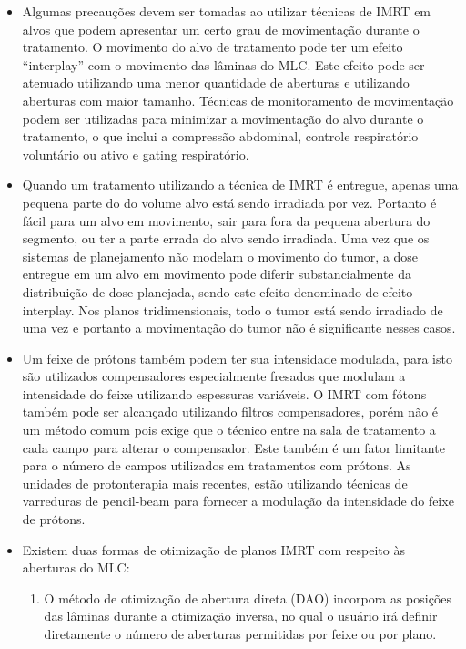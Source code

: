 \documentclass[11pt,a4paper]{article}
\newcounter{exemplo}
\begin{document}
\begin{exemplo}
\begin{itemize}
        \item Algumas precauções devem ser tomadas ao utilizar técnicas de IMRT em alvos que podem apresentar um certo grau de movimentação durante o tratamento. O movimento do alvo de tratamento pode ter um efeito ``interplay'' com o movimento das lâminas do MLC. Este efeito pode ser atenuado utilizando uma menor quantidade de aberturas e utilizando aberturas com maior tamanho. Técnicas de monitoramento de movimentação podem ser utilizadas para minimizar a movimentação do alvo durante o tratamento, o que inclui a compressão abdominal, controle respiratório voluntário ou ativo e gating respiratório.
        
        \item Quando um tratamento utilizando a técnica de IMRT é entregue, apenas uma pequena parte do do volume alvo está sendo irradiada por vez. Portanto é fácil para um alvo em movimento, sair para fora da pequena abertura do segmento, ou ter a parte errada do alvo sendo irradiada. Uma vez que os sistemas de planejamento não modelam o movimento do tumor, a dose entregue em um alvo em movimento pode diferir substancialmente da distribuição de dose planejada, sendo este efeito denominado de \textcolor{CarnationPink}{efeito interplay}. Nos planos tridimensionais, todo o tumor está sendo irradiado de uma vez e portanto a movimentação do tumor não é significante nesses casos.
        
        \item Um feixe de prótons também podem ter sua intensidade modulada, para isto são utilizados compensadores especialmente fresados que modulam a intensidade do feixe utilizando espessuras variáveis. O IMRT com fótons também pode ser alcançado utilizando filtros compensadores, porém não é um método comum pois exige que o técnico entre na sala de tratamento a cada campo para alterar o compensador. Este também é um fator limitante para o número de campos utilizados em tratamentos com prótons. As unidades de protonterapia mais recentes, estão utilizando técnicas de varreduras de pencil-beam para fornecer a modulação da intensidade do feixe de prótons.
        
        \item Existem duas formas de otimização de planos IMRT com respeito às aberturas do MLC:
        
            \begin{enumerate}[label=\textcolor{CarnationPink}{\roman*.}]
                \item O método de otimização de abertura direta (DAO) incorpora as posições das lâminas durante a otimização inversa, no qual o usuário irá definir diretamente o número de aberturas permitidas por feixe ou por plano.
                

\end{enumerate}
\end{itemize}
\end{exemplo}
\end{document}
